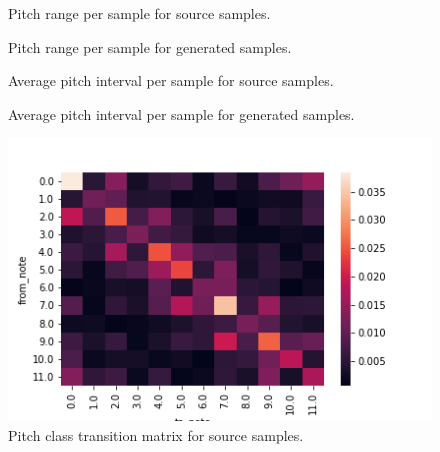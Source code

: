 \documentclass[sigconf,authorversion]{acmart}
\begin{document}
\begin{figure}[htbp]
    \begin{center}
        \scalebox{0.6}{}
    \end{center}
    \caption{Pitch range per sample for source samples.}
    \label{source_ranges}
\end{figure}

\begin{figure}[htbp]
    \begin{center}
        \scalebox{0.6}{}
    \end{center}
    \caption{Pitch range per sample for generated samples.}
    \label{generated_ranges}
\end{figure}

\begin{figure}[htbp]
    \begin{center}
        \scalebox{0.6}{}
    \end{center}
    \caption{Average pitch interval per sample for source samples.}
    \label{source_interval}
\end{figure}

\begin{figure}[htbp]
    \begin{center}
        \scalebox{0.6}{}
    \end{center}
    \caption{Average pitch interval per sample for generated samples.}
    \label{generated_interval}
\end{figure}


\begin{figure}[htbp]
  \centering
  \includegraphics[width=\linewidth]{figures/pctm_source.png}
  \caption{Pitch class transition matrix for source samples.}
  \label{pctm_source}
\end{figure}
\end{document}
